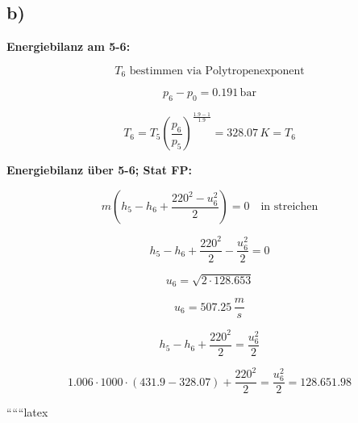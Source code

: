 

\subsection*{b)}

\textbf{Energiebilanz am 5-6:}

\[ T_6 \text{ bestimmen via Polytropenexponent} \]

\[ p_6 - p_0 = 0.191 \, \text{bar} \]

\[ T_6 = T_5 \left(\frac{p_6}{p_5}\right)^{\frac{1.9-1}{1.9}} = 328.07 \, K = T_6 \]

\textbf{Energiebilanz über 5-6; Stat FP:}

\[ m \left( h_5 - h_6 + \frac{220^2 - u_6^2}{2} \right) = 0 \quad \text{in streichen} \]

\[ h_5 - h_6 + \frac{220^2}{2} - \frac{u_6^2}{2} = 0 \]

\[ u_6 = \sqrt{2 \cdot 128.653} \]

\[ u_6 = 507.25 \, \frac{m}{s} \]

\[ h_5 - h_6 + \frac{220^2}{2} = \frac{u_6^2}{2} \]

\[ 1.006 \cdot 1000 \cdot (431.9 - 328.07) + \frac{220^2}{2} = \frac{u_6^2}{2} = 128.651.98 \]

``````latex